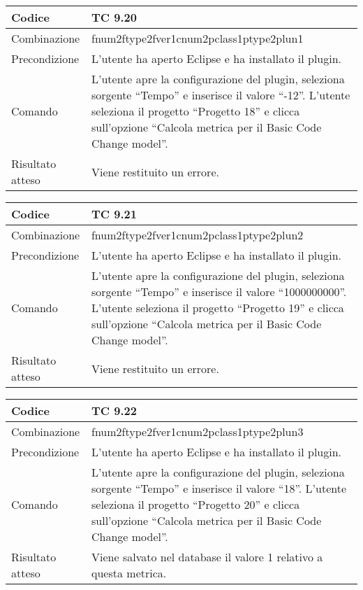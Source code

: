 \begin{table}[ht]
\begin{tabular}{|p{3cm}|p{9cm}|}
\hline
\cellcolor{lightgray}Codice				& TC 9.20								\\
\hline
\cellcolor{lightgray}Combinazione		& fnum2ftype2fver1cnum2pclass1ptype2plun1									\\
\hline
\cellcolor{lightgray}Precondizione		& L'utente ha aperto Eclipse e ha installato il plugin.		\\
\hline
\cellcolor{lightgray}Comando			& L'utente apre la configurazione del plugin, seleziona sorgente ``Tempo'' e inserisce il valore ``-12''. L'utente seleziona il progetto ``Progetto 18''  e clicca sull'opzione ``Calcola metrica per il Basic Code Change model''.	\\
\hline
\cellcolor{lightgray}Risultato atteso	& Viene restituito un errore.\\
\hline
\end{tabular}
\end{table}

\begin{table}[ht]
\begin{tabular}{|p{3cm}|p{9cm}|}
\hline
\cellcolor{lightgray}Codice				& TC 9.21								\\
\hline
\cellcolor{lightgray}Combinazione		& fnum2ftype2fver1cnum2pclass1ptype2plun2									\\
\hline
\cellcolor{lightgray}Precondizione		& L'utente ha aperto Eclipse e ha installato il plugin.		\\
\hline
\cellcolor{lightgray}Comando			& L'utente apre la configurazione del plugin, seleziona sorgente ``Tempo'' e inserisce il valore ``1000000000''. L'utente seleziona il progetto ``Progetto 19''  e clicca sull'opzione ``Calcola metrica per il Basic Code Change model''.	\\
\hline
\cellcolor{lightgray}Risultato atteso	& Viene restituito un errore.\\
\hline
\end{tabular}
\end{table}

\begin{table}[ht]
\begin{tabular}{|p{3cm}|p{9cm}|}
\hline
\cellcolor{lightgray}Codice				& TC 9.22								\\
\hline
\cellcolor{lightgray}Combinazione		& fnum2ftype2fver1cnum2pclass1ptype2plun3									\\
\hline
\cellcolor{lightgray}Precondizione		& L'utente ha aperto Eclipse e ha installato il plugin.		\\
\hline
\cellcolor{lightgray}Comando			& L'utente apre la configurazione del plugin, seleziona sorgente ``Tempo'' e inserisce il valore ``18''. L'utente seleziona il progetto ``Progetto 20''  e clicca sull'opzione ``Calcola metrica per il Basic Code Change model''.	\\
\hline
\cellcolor{lightgray}Risultato atteso	& Viene salvato nel database il valore 1 relativo a questa metrica.\\
\hline
\end{tabular}
\end{table}




